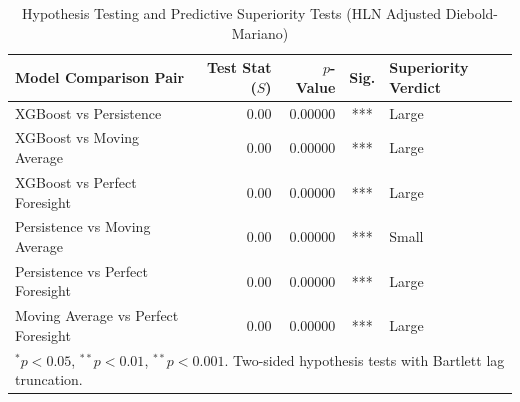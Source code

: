 \begin{table}[htbp]
\centering
\small
\caption{Hypothesis Testing and Predictive Superiority Tests (HLN Adjusted Diebold-Mariano)}
\label{tab:statistical_significance}
\begin{tabular}{lrrcl}
\toprule
\textbf{Model Comparison Pair} & \textbf{Test Stat ($S$)} & \textbf{$p$-Value} & \textbf{Sig.} & \textbf{Superiority Verdict} \\
\midrule
XGBoost vs Persistence              &     0.00 &  0.00000 & ***   & Large \\
XGBoost vs Moving Average           &     0.00 &  0.00000 & ***   & Large \\
XGBoost vs Perfect Foresight        &     0.00 &  0.00000 & ***   & Large \\
Persistence vs Moving Average       &     0.00 &  0.00000 & ***   & Small \\
Persistence vs Perfect Foresight    &     0.00 &  0.00000 & ***   & Large \\
Moving Average vs Perfect Foresight &     0.00 &  0.00000 & ***   & Large \\
\bottomrule
\multicolumn{5}{l}{\footnotesize $^*p<0.05$, $^{**}p<0.01$, $^{{**}}p<0.001$. Two-sided hypothesis tests with Bartlett lag truncation.}
\end{tabular}
\end{table}
